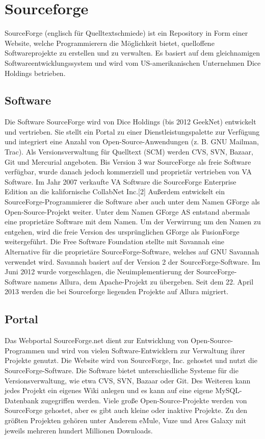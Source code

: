\section{Sourceforge}
SourceForge (englisch für Quelltextschmiede) ist ein Repository in Form einer Website, 
welche Programmierern die Möglichkeit bietet, quelloffene Softwareprojekte zu erstellen und zu verwalten. 
Es basiert auf dem gleichnamigen Softwareentwicklungssystem und wird vom US-amerikanischen Unternehmen 
Dice Holdings betrieben.
\subsection{Software}
Die Software SourceForge wird von Dice Holdings (bis 2012 GeekNet) entwickelt und vertrieben. 
Sie stellt ein Portal zu einer Dienstleistungspalette zur Verfügung und integriert eine 
Anzahl von Open-Source-Anwendungen (z. B. GNU Mailman, Trac). Als Versionsverwaltung für Quelltext (SCM) 
werden CVS, SVN, Bazaar, Git und Mercurial angeboten. Bis Version 3 war SourceForge als freie 
Software verfügbar, wurde danach jedoch kommerziell und proprietär vertrieben von VA Software. 
Im Jahr 2007 verkaufte VA Software die SourceForge Enterprise Edition an die kalifornische 
CollabNet Inc.[2] Außerdem entwickelt ein SourceForge-Programmierer die Software aber auch unter dem 
Namen GForge als Open-Source-Projekt weiter. Unter dem Namen GForge AS entstand abermals eine proprietäre 
Software mit dem Namen. Um der Verwirrung um den Namen zu entgehen, wird die freie Version des 
ursprünglichen GForge als FusionForge weitergeführt. Die Free Software Foundation stellte mit Savannah eine 
Alternative für die proprietäre SourceForge-Software, welches auf GNU Savannah verwendet wird. 
Savannah basiert auf der Version 2 der SourceForge-Software. Im Juni 2012 wurde vorgeschlagen, 
die Neuimplementierung der SourceForge-Software namens Allura, dem Apache-Projekt zu übergeben. 
Seit dem 22. April 2013 werden die bei Sourceforge liegenden Projekte auf Allura migriert.
\subsection{Portal}
Das Webportal SourceForge.net dient zur Entwicklung von Open-Source-Programmen und wird von vielen 
Software-Entwicklern zur Verwaltung ihrer Projekte genutzt. Die Website wird von SourceForge, Inc. 
gehostet und nutzt die SourceForge-Software. Die Software bietet unterschiedliche Systeme für 
die Versionsverwaltung, wie etwa CVS, SVN, Bazaar oder Git. Des Weiteren kann jedes Projekt ein 
eigenes Wiki anlegen und es kann auf eine eigene MySQL-Datenbank zugegriffen werden. 
Viele große Open-Source-Projekte werden von SourceForge gehostet, aber es gibt auch kleine oder 
inaktive Projekte. Zu den größten Projekten gehören unter Anderem eMule, Vuze und Ares Galaxy mit 
jeweils mehreren hundert Millionen Downloads.
